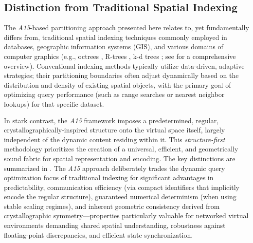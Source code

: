 \documentclass[10pt]{article}
\def\AAAB{\textit{A15}}
\begin{document}
\subsection{Distinction from Traditional Spatial Indexing}\label{subsec-comparison-indexing}

The \AAAB{}-based partitioning approach presented here relates to, yet fundamentally differs from, traditional spatial indexing techniques commonly employed in databases, geographic information systems (GIS), and various domains of computer graphics (e.g., octrees \cite{Finkel1974}, R-trees \cite{Guttman1984}, k-d trees \cite{Bentley1975}; see \cite{Samet1990} for a comprehensive overview). Conventional indexing methods typically utilize data-driven, adaptive strategies; their partitioning boundaries often adjust dynamically based on the distribution and density of existing spatial objects, with the primary goal of optimizing query performance (such as range searches or nearest neighbor lookups) for that specific dataset.

In stark contrast, the \AAAB{} framework imposes a predetermined, regular, crystallographically-inspired structure onto the virtual space itself, largely independent of the dynamic content residing within it. This \emph{structure-first} methodology prioritizes the creation of a universal, efficient, and geometrically sound fabric for spatial representation and encoding. The key distinctions are summarized in . The \AAAB{} approach deliberately trades the dynamic query optimization focus of traditional indexing for significant advantages in predictability, communication efficiency (via compact identifiers that implicitly encode the regular structure), guaranteed numerical determinism (when using stable scaling regimes), and inherent geometric consistency derived from crystallographic symmetry—properties particularly valuable for networked virtual environments demanding shared spatial understanding, robustness against floating-point discrepancies, and efficient state synchronization.
\end{document}
